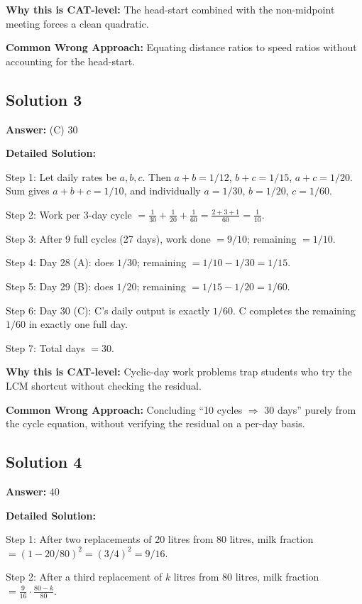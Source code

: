 \documentclass[11pt]{article}
\begin{document}
\textbf{Why this is CAT-level:} The head-start combined with the non-midpoint meeting forces a clean quadratic.

\textbf{Common Wrong Approach:} Equating distance ratios to speed ratios without accounting for the head-start.

\subsection*{Solution 3}

\textbf{Answer:} (C) \(30\)

\textbf{Detailed Solution:}

Step 1: Let daily rates be \(a, b, c\). Then \(a+b=1/12\), \(b+c=1/15\), \(a+c=1/20\). Sum gives \(a+b+c = 1/10\), and individually \(a=1/30\), \(b=1/20\), \(c=1/60\).

Step 2: Work per 3-day cycle \(=\frac{1}{30}+\frac{1}{20}+\frac{1}{60}=\frac{2+3+1}{60}=\frac{1}{10}\).

Step 3: After 9 full cycles (27 days), work done \(= 9/10\); remaining \(= 1/10\).

Step 4: Day 28 (A): does \(1/30\); remaining \(= 1/10 - 1/30 = 1/15\).

Step 5: Day 29 (B): does \(1/20\); remaining \(= 1/15 - 1/20 = 1/60\).

Step 6: Day 30 (C): C's daily output is exactly \(1/60\). C completes the remaining \(1/60\) in exactly one full day.

Step 7: Total days \(= 30\).

\textbf{Why this is CAT-level:} Cyclic-day work problems trap students who try the LCM shortcut without checking the residual.

\textbf{Common Wrong Approach:} Concluding ``10 cycles \(\Rightarrow\) 30 days'' purely from the cycle equation, without verifying the residual on a per-day basis.

\subsection*{Solution 4}

\textbf{Answer:} \(40\)

\textbf{Detailed Solution:}

Step 1: After two replacements of 20 litres from 80 litres, milk fraction \(= (1 - 20/80)^2 = (3/4)^2 = 9/16\).

Step 2: After a third replacement of \(k\) litres from 80 litres, milk fraction \(= \frac{9}{16}\cdot\frac{80-k}{80}\).
\end{document}
